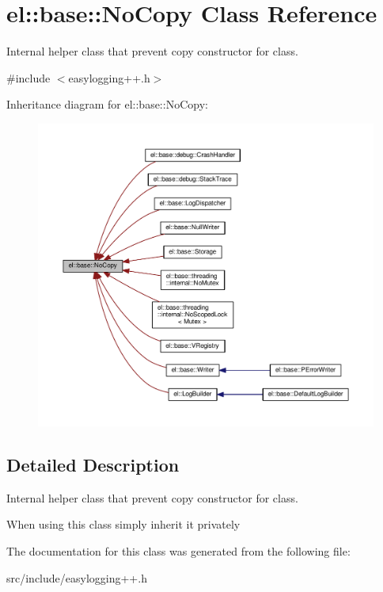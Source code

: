 \hypertarget{classel_1_1base_1_1_no_copy}{}\section{el\+:\+:base\+:\+:No\+Copy Class Reference}
\label{classel_1_1base_1_1_no_copy}


Internal helper class that prevent copy constructor for class.  




{\ttfamily \#include $<$easylogging++.\+h$>$}



Inheritance diagram for el\+:\+:base\+:\+:No\+Copy\+:
\nopagebreak
\begin{figure}[H]
\begin{center}
\leavevmode
\includegraphics[width=350pt]{classel_1_1base_1_1_no_copy__inherit__graph}
\end{center}
\end{figure}


\subsection{Detailed Description}
Internal helper class that prevent copy constructor for class. 

When using this class simply inherit it privately 

The documentation for this class was generated from the following file\+:\begin{DoxyCompactItemize}
\item 
src/include/easylogging++.\+h\end{DoxyCompactItemize}
